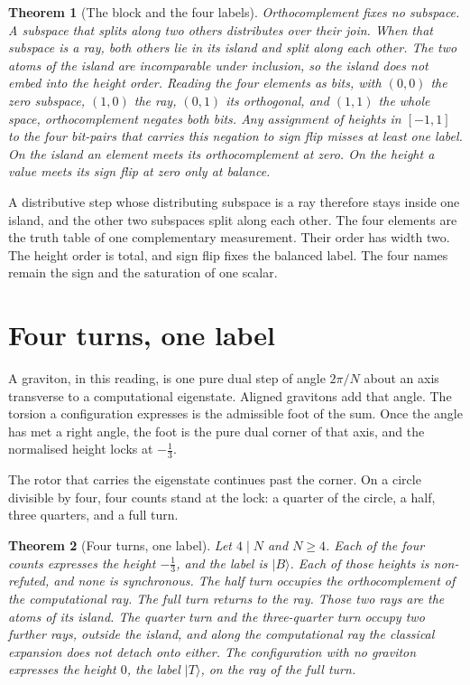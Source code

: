 \documentclass[a4paper]{article}
\newtheorem{theorem}{Theorem}[section]
\theoremstyle{definition}
\begin{document}
\begin{theorem}[The block and the four labels]
\label{thm:blockfour}
Orthocomplement fixes no subspace. A subspace that splits along two
others distributes over their join. When that subspace is a ray, both
others lie in its island and split along each other. The two atoms of
the island are incomparable under inclusion, so the island does not
embed into the height order. Reading the four elements as bits, with
\((0,0)\) the zero subspace, \((1,0)\) the ray, \((0,1)\) its
orthogonal, and \((1,1)\) the whole space, orthocomplement negates both
bits. Any assignment of heights in \([-1,1]\) to the four bit-pairs
that carries this negation to sign flip misses at least one label. On
the island an element meets its orthocomplement at zero. On the height
a value meets its sign flip at zero only at balance.
\end{theorem}

A distributive step whose distributing subspace is a ray therefore stays
inside one island, and the other two subspaces split along each other.
The four elements are the truth table of one complementary measurement.
Their order has width two. The height order is total, and sign flip
fixes the balanced label. The four names remain the sign and the
saturation of one scalar.

\section{Four turns, one label}
\label{sec:turns}

A graviton, in this reading, is one pure dual step of angle \(2\pi/N\)
about an axis transverse to a computational eigenstate. Aligned
gravitons add that angle. The torsion a configuration expresses is the
admissible foot of the sum. Once the angle has met a right angle, the
foot is the pure dual corner of that axis, and the normalised height
locks at \(-\frac13\).

The rotor that carries the eigenstate continues past the corner. On a
circle divisible by four, four counts stand at the lock: a quarter of
the circle, a half, three quarters, and a full turn.

\begin{theorem}[Four turns, one label]
\label{thm:turns}
Let \(4\mid N\) and \(N\ge 4\). Each of the four counts expresses the
height \(-\frac13\), and the label is \(\lvert B\rangle\). Each of those
heights is non-refuted, and none is synchronous. The half turn occupies
the orthocomplement of the computational ray. The full turn returns to
the ray. Those two rays are the atoms of its island. The quarter turn
and the three-quarter turn occupy two further rays, outside the island,
and along the computational ray the classical expansion does not detach
onto either. The configuration with no graviton expresses the height
\(0\), the label \(\lvert T\rangle\), on the ray of the full turn.
\end{theorem}
\end{document}
